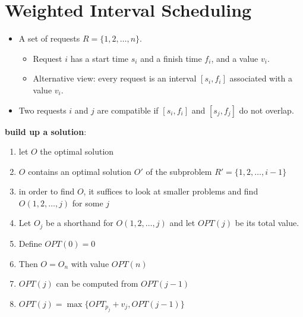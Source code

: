 \documentclass[onecolumn]{report}
\begin{document}
\section{Weighted Interval Scheduling}
\begin{itemize}
    \item A set of requests $R=\{1,2,\dots,n\}$.
    \begin{itemize}
        \item Request $i$ has a start time $s_i$ and a finish time $f_i$, and a value $v_i$.
        \item Alternative view: every request is an interval $[s_i,f_i]$ associated with a value $v_i$.
    \end{itemize}
    \item Two requests $i$ and $j$ are compatible if $[s_i,f_i]$ and $[s_j,f_j]$ do not overlap.
\end{itemize}
\textbf{build up a solution}:
\begin{enumerate}
    \item let $O$ the optimal solution
    \item $O$ contains an optimal solution $O'$ of the subproblem $R'=\{1,2,\dots,i-1\}$
    \item in order to find $O$, it suffices to look at smaller problems and find $O(1,2,\dots,j)$ for some $j$
    \item Let $O_j$ be a shorthand for $O(1,2,\dots,j)$ and let $OPT(j)$ be its total value.
    \item Define $OPT(0)=0$
    \item Then $O=O_n$ with value $OPT(n)$
    \item $OPT(j)$ can be computed from $OPT(j-1)$
    \item $OPT(j)=\max\{OPT_{p_j}+v_j,OPT(j-1)\}$
\end{enumerate}
\end{document}
